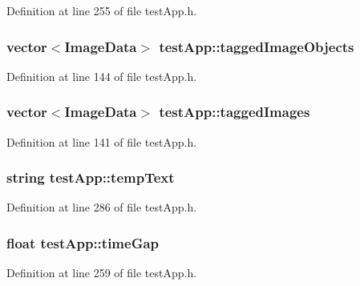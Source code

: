 Definition at line 255 of file test\-App.\-h.

\hypertarget{classtest_app_af65c8dc2f4620bfe7fdf6a39043cb48d}{
\subsubsection[{tagged\-Image\-Objects}]{\setlength{\rightskip}{0pt plus 5cm}vector$<${\bf Image\-Data}$>$ test\-App\-::tagged\-Image\-Objects}}\label{classtest_app_af65c8dc2f4620bfe7fdf6a39043cb48d}


Definition at line 144 of file test\-App.\-h.

\hypertarget{classtest_app_a7f7226fc54fdb7d06366ed0fa3ab7ee3}{
\subsubsection[{tagged\-Images}]{\setlength{\rightskip}{0pt plus 5cm}vector$<${\bf Image\-Data}$>$ test\-App\-::tagged\-Images}}\label{classtest_app_a7f7226fc54fdb7d06366ed0fa3ab7ee3}


Definition at line 141 of file test\-App.\-h.

\hypertarget{classtest_app_ad9a4beab6f2e0f13d32b00b502e89bdc}{
\subsubsection[{temp\-Text}]{\setlength{\rightskip}{0pt plus 5cm}string test\-App\-::temp\-Text}}\label{classtest_app_ad9a4beab6f2e0f13d32b00b502e89bdc}


Definition at line 286 of file test\-App.\-h.

\hypertarget{classtest_app_a944f2713019239a4b49241a5cc9a00c9}{
\subsubsection[{time\-Gap}]{\setlength{\rightskip}{0pt plus 5cm}float test\-App\-::time\-Gap}}\label{classtest_app_a944f2713019239a4b49241a5cc9a00c9}


Definition at line 259 of file test\-App.\-h.

